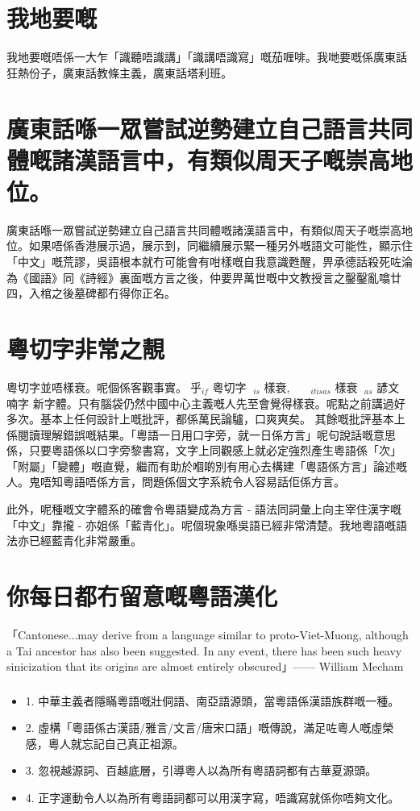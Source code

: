 \documentclass[a5paper, 10pt, openany]{book} %
\begin{document}
\chapter{我地要嘅}
我地要嘅唔係一大乍「識聽唔識講」「識講唔識寫」嘅茄喱啡。我哋要嘅係廣東話狂熱份子，廣東話教條主義，廣東話塔利班。
\chapter{廣東話喺一眾嘗試逆勢建立自己語言共同體嘅諸漢語言中，有類似周天子嘅崇高地位。}

廣東話喺一眾嘗試逆勢建立自己語言共同體嘅諸漢語言中，有類似周天子嘅崇高地位。如果唔係香港展示過，展示到，同繼續展示緊一種另外嘅語文可能性，顯示住「中文」嘅荒謬，吳語根本就冇可能會有咁樣嘅自我意識甦醒，畀承德話殺死咗淪為《國語》同《詩經》裏面嘅方言之後，仲要畀萬世嘅中文教授言之鑿鑿亂噏廿四，入棺之後墓碑都冇得你正名。


\chapter{粵切字非常之靚}
粵切字並唔樣衰。呢個係客觀事實。乎$_{if}$ 粵切字 $_{is}$ 樣衰,   $_{it is as}$ 樣衰 $_{as}$ 諺文 喃字 新字體。只有腦袋仍然中國中心主義嘅人先至會覺得樣衰。呢點之前講過好多次。基本上任何設計上嘅批評，都係萬民論驢，口爽爽矣。
其餘嘅批評基本上係閱讀理解錯誤嘅結果。「粵語一日用口字旁，就一日係方言」呢句說話嘅意思係，只要粵語係以口字旁黎書寫，文字上同觀感上就必定強烈產生粵語係「次」「附屬」「變體」嘅直覺，繼而有助於嗰啲別有用心去構建「粵語係方言」論述嘅人。鬼唔知粵語唔係方言，問題係個文字系統令人容易話佢係方言。

此外，呢種嘅文字體系的確會令粵語變成為方言 - 語法同詞彙上向主宰住漢字嘅「中文」靠攏 - 亦姐係「藍青化」。呢個現象喺吳語已經非常清楚。我地粵語嘅語法亦已經藍青化非常嚴重。

\chapter{你每日都冇留意嘅粵語漢化}

「Cantonese...may derive from a language similar to proto-Viet-Muong, although a Tai ancestor has also been suggested. In any event, there has been such heavy sinicization that its origins are almost entirely obscured」—— William Mecham

\subsection{}
\begin{itemize}
  \item[] 1. 中華主義者隱瞞粵語嘅壯侗語、南亞語源頭，當粵語係漢語族群嘅一種。

  \item[] 2. 虛構「粵語係古漢語/雅言/文言/唐宋口語」嘅傳說，滿足咗粵人嘅虛榮感，粵人就忘記自己真正祖源。

  \item[] 3. 忽視越源詞、百越底層，引導粵人以為所有粵語詞都有古華夏源頭。

  \item[] 4. 正字運動令人以為所有粵語詞都可以用漢字寫，唔識寫就係你唔夠文化。
\end{itemize}
\end{document}
